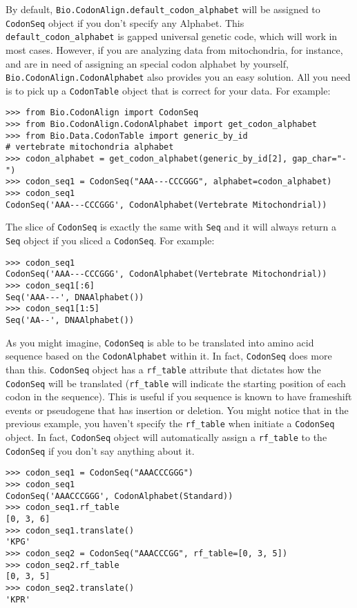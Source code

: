 \documentclass{article}
\begin{document}
By default, \texttt{Bio.CodonAlign.default\_codon\_alphabet} will be
assigned to \texttt{CodonSeq} object if you don't specify any Alphabet.
This \texttt{default\_codon\_alphabet} is gapped universal genetic code,
which will work in most cases. However, if you are analyzing data from
mitochondria, for instance, and are in need of assigning an special
codon alphabet by yourself, \texttt{Bio.CodonAlign.CodonAlphabet} also
provides you an easy solution. All you need is to pick up a
\texttt{CodonTable} object that is correct for your data. For example:

\begin{verbatim}
>>> from Bio.CodonAlign import CodonSeq
>>> from Bio.CodonAlign.CodonAlphabet import get_codon_alphabet
>>> from Bio.Data.CodonTable import generic_by_id
# vertebrate mitochondria alphabet
>>> codon_alphabet = get_codon_alphabet(generic_by_id[2], gap_char="-")
>>> codon_seq1 = CodonSeq("AAA---CCCGGG", alphabet=codon_alphabet)
>>> codon_seq1
CodonSeq('AAA---CCCGGG', CodonAlphabet(Vertebrate Mitochondrial))
\end{verbatim}

The slice of \texttt{CodonSeq} is exactly the same with \texttt{Seq} and
it will always return a \texttt{Seq} object if you sliced a
\texttt{CodonSeq}. For example:

\begin{verbatim}
>>> codon_seq1
CodonSeq('AAA---CCCGGG', CodonAlphabet(Vertebrate Mitochondrial))
>>> codon_seq1[:6]
Seq('AAA---', DNAAlphabet())
>>> codon_seq1[1:5]
Seq('AA--', DNAAlphabet())
\end{verbatim}

As you might imagine, \texttt{CodonSeq} is able to be translated into
amino acid sequence based on the \texttt{CodonAlphabet} within it. In
fact, \texttt{CodonSeq} does more than this. \texttt{CodonSeq} object
has a \texttt{rf\_table} attribute that dictates how the
\texttt{CodonSeq} will be translated (\texttt{rf\_table} will indicate
the starting position of each codon in the sequence). This is useful if
you sequence is known to have frameshift events or pseudogene that has
insertion or deletion. You might notice that in the previous example,
you haven't specify the \texttt{rf\_table} when initiate a
\texttt{CodonSeq} object. In fact, \texttt{CodonSeq} object will
automatically assign a \texttt{rf\_table} to the \texttt{CodonSeq} if
you don't say anything about it.

\begin{verbatim}
>>> codon_seq1 = CodonSeq("AAACCCGGG")
>>> codon_seq1
CodonSeq('AAACCCGGG', CodonAlphabet(Standard))
>>> codon_seq1.rf_table
[0, 3, 6]
>>> codon_seq1.translate()
'KPG'
>>> codon_seq2 = CodonSeq("AAACCCGG", rf_table=[0, 3, 5])
>>> codon_seq2.rf_table
[0, 3, 5]
>>> codon_seq2.translate()
'KPR'
\end{verbatim}
\end{document}
